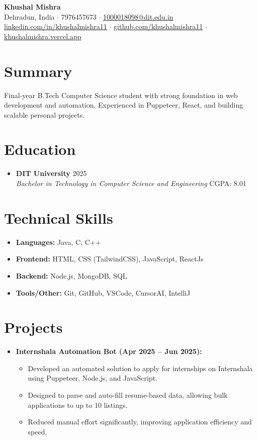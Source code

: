 \documentclass[a4paper,10pt]{article}
\newcommand{\resumeSubheading}[4]{
  \vspace{1pt}\item[]
    {\textbf{#1}} \hfill {#2}\\
    {\textit{#3}} \hfill {#4}\\
}
\begin{document}
\begin{center}
  {\LARGE \textbf{Khushal Mishra}} \\ 
  Dehradun, India $\cdot$ 7976457673 $\cdot$ \href{mailto:1000018098@dit.edu.in}{1000018098@dit.edu.in} \\ 
  \href{https://linkedin.com/in/khushalmishra11}{linkedin.com/in/khushalmishra11} $\cdot$ 
  \href{https://github.com/khushalmishra11}{github.com/khushalmishra11} $\cdot$ 
  \href{https://khushalmishra.vercel.app}{khushalmishra.vercel.app} \\ 
\end{center}

\section*{Summary}
Final-year B.Tech Computer Science student with strong foundation in web development and automation. Experienced in Puppeteer, React, and building scalable personal projects.

\section*{Education}
\begin{itemize}[leftmargin=*]
  \resumeSubheading{DIT University}{2025}{Bachelor in Technology in Computer Science and Engineering}{CGPA: 8.01}
\end{itemize}

\section*{Technical Skills}
\begin{itemize}[leftmargin=*]
  \item \textbf{Languages:} Java, C, C++
  \item \textbf{Frontend:} HTML, CSS (TailwindCSS), JavaScript, ReactJs
  \item \textbf{Backend:} Node.js, MongoDB, SQL
  \item \textbf{Tools/Other:} Git, GitHub, VSCode, CursorAI, IntelliJ
\end{itemize}

\section*{Projects}
\begin{itemize}[leftmargin=*]
  \item \textbf{Internshala Automation Bot (Apr 2025 -- Jun 2025):}
  \begin{itemize}
    \item Developed an automated solution to apply for internships on Internshala using Puppeteer, Node.js, and JavaScript.
    \item Designed to parse and auto-fill resume-based data, allowing bulk applications to up to 10 listings.
    \item Reduced manual effort significantly, improving application efficiency and speed.
  \end{itemize}
\end{itemize}
\end{document}
